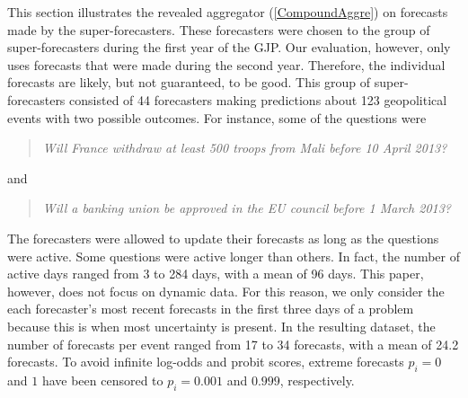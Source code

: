 \documentclass[11pt]{article}
\theoremstyle{definition}
\theoremstyle{definition}
\begin{document}
This section illustrates the revealed aggregator (\ref{CompoundAggre}) on forecasts made by the super-forecasters. These forecasters were chosen to the group of super-forecasters during the first year of the GJP. Our evaluation, however, only uses forecasts that were made during the second year. Therefore, the individual forecasts are likely, but not guaranteed, to be good. This group of super-forecasters consisted of 44 forecasters making predictions about 123 geopolitical events with two possible outcomes. For instance, some of the questions were
\begin{quote}\textit{
Will France withdraw at least 500 troops from Mali before 10 April 2013?
}\end{quote}
and
\begin{quote}\textit{
Will a banking union be approved in the EU council before 1 March 2013? 
}
\end{quote}
 The forecasters were allowed to update their forecasts as long as the questions were active. Some questions were active longer than others. In fact, the number of active days ranged from 3 to 284 days, with a mean of 96 days. This paper, however, does not focus on dynamic data. For this reason, we only consider the each forecaster's most recent forecasts in the first three days of a problem because this is when most uncertainty is present. 
In the resulting dataset, the number of forecasts per event ranged from 17 to 34 forecasts, with a mean of 24.2 forecasts. To avoid infinite log-odds and probit scores, extreme forecasts $p_i = 0$ and $1$ have been censored to $p_i = 0.001$ and $0.999$, respectively.
 
\end{document}
